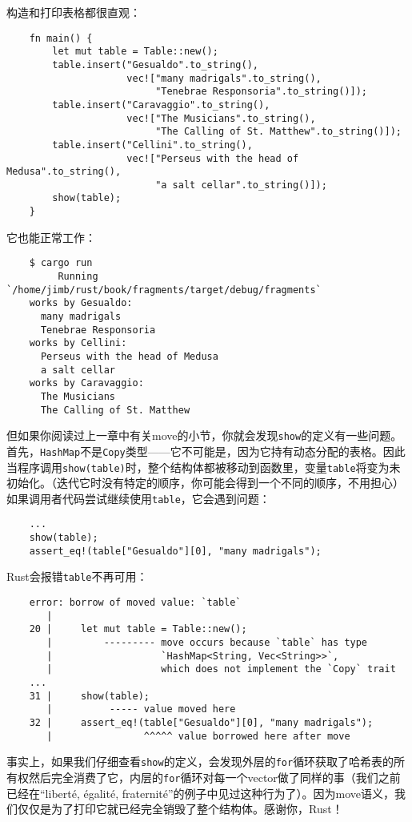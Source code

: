 构造和打印表格都很直观：
\begin{verbatim}
    fn main() {
        let mut table = Table::new();
        table.insert("Gesualdo".to_string(),
                     vec!["many madrigals".to_string(),
                          "Tenebrae Responsoria".to_string()]);
        table.insert("Caravaggio".to_string(),
                     vec!["The Musicians".to_string(),
                          "The Calling of St. Matthew".to_string()]);
        table.insert("Cellini".to_string(),
                     vec!["Perseus with the head of Medusa".to_string(),
                          "a salt cellar".to_string()]);
        show(table);
    }
\end{verbatim}

它也能正常工作：
\begin{verbatim}
    $ cargo run
         Running `/home/jimb/rust/book/fragments/target/debug/fragments`
    works by Gesualdo:
      many madrigals
      Tenebrae Responsoria
    works by Cellini:
      Perseus with the head of Medusa
      a salt cellar
    works by Caravaggio:
      The Musicians
      The Calling of St. Matthew
\end{verbatim}

但如果你阅读过上一章中有关move的小节，你就会发现\texttt{show}的定义有一些问题。首先，\texttt{HashMap}不是\texttt{Copy}类型——它不可能是，因为它持有动态分配的表格。因此当程序调用\texttt{show(table)}时，整个结构体都被移动到函数里，变量\texttt{table}将变为未初始化。（迭代它时没有特定的顺序，你可能会得到一个不同的顺序，不用担心）如果调用者代码尝试继续使用\texttt{table}，它会遇到问题：
\begin{verbatim}
    ...
    show(table);
    assert_eq!(table["Gesualdo"][0], "many madrigals");
\end{verbatim}

Rust会报错\texttt{table}不再可用：
\begin{verbatim}
    error: borrow of moved value: `table`
       |
    20 |     let mut table = Table::new();
       |         --------- move occurs because `table` has type
       |                   `HashMap<String, Vec<String>>`,
       |                   which does not implement the `Copy` trait
    ...
    31 |     show(table);
       |          ----- value moved here
    32 |     assert_eq!(table["Gesualdo"][0], "many madrigals");
       |                ^^^^^ value borrowed here after move
\end{verbatim}

事实上，如果我们仔细查看\texttt{show}的定义，会发现外层的\texttt{for}循环获取了哈希表的所有权然后完全消费了它，内层的\texttt{for}循环对每一个vector做了同样的事（我们之前已经在“liberté, égalité, fraternité”的例子中见过这种行为了）。因为move语义，我们仅仅是为了打印它就已经完全销毁了整个结构体。感谢你，Rust！


